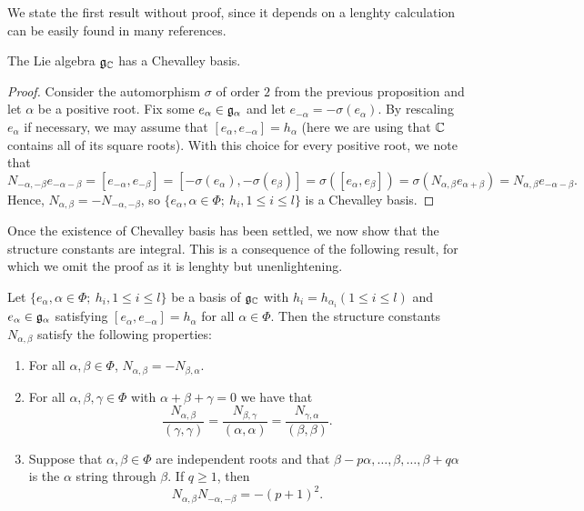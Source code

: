 We state the first result without proof, since it depends on a lenghty calculation can be easily found in many references.

\begin{cor}[Chevalley, 1955]\label{cor:chevalleybasis}
    The Lie algebra $\mathfrak{g}_{\mathbb{C}}$ has a Chevalley basis.
\end{cor}
\begin{proof}
    Consider the automorphism $\sigma$ of order $2$ from the previous proposition and let $\alpha$ be a positive root. Fix some $e_\alpha\in\mathfrak{g}_\alpha$ and let $e_{-\alpha}=-\sigma(e_\alpha)$. By rescaling $e_\alpha$ if necessary, we may assume that $[e_\alpha,e_{-\alpha}]=h_\alpha$ (here we are using that $\mathbb{C}$ contains all of its square roots). With this choice for every positive root, we note that 
    $$N_{-\alpha,-\beta}e_{-\alpha-\beta}=[e_{-\alpha},e_{-\beta}]=[-\sigma(e_\alpha),-\sigma(e_\beta)]=\sigma([e_\alpha,e_\beta])=\sigma(N_{\alpha,\beta}e_{\alpha+\beta})=N_{\alpha,\beta}e_{-\alpha-\beta}.$$
    Hence, $N_{\alpha,\beta}=-N_{-\alpha,-\beta}$, so $\{e_\alpha,\alpha\in\Phi;\ h_i, 1\leq i\leq l\}$ is a Chevalley basis.
\end{proof}

Once the existence of Chevalley basis has been settled, we now show that the structure constants are integral. This is a consequence of the following result, for which we omit the proof as it is lenghty but unenlightening. 

\begin{theorem}
    Let $\{e_\alpha,\alpha\in\Phi;\ h_i,1\leq i\leq l\}$ be a basis of $\mathfrak{g}_{\mathbb{C}}$ with $h_i=h_{\alpha_i}(1\leq i\leq l)$ and $e_\alpha\in\mathfrak{g}_\alpha$ satisfying $[e_\alpha,e_{-\alpha}]=h_\alpha$ for all $\alpha\in\Phi$. Then the structure constants $N_{\alpha,\beta}$ satisfy the following properties:
    \begin{enumerate}
        \item For all $\alpha,\beta\in\Phi$, $N_{\alpha,\beta}=-N_{\beta,\alpha}$.
        \item For all $\alpha,\beta,\gamma\in\Phi$ with $\alpha+\beta+\gamma=0$ we have that 
        $$\frac{N_{\alpha,\beta}}{(\gamma,\gamma)}=\frac{N_{\beta,\gamma}}{(\alpha,\alpha)}=\frac{N_{\gamma,\alpha}}{(\beta,\beta)}.$$
        \item Suppose that $\alpha,\beta\in\Phi$ are independent roots and that $\beta-p\alpha,\ldots,\beta,\ldots,\beta+q\alpha$ is the $\alpha$ string through $\beta$. If $q\geq1$, then 
        $$N_{\alpha,\beta}N_{-\alpha,-\beta}=-(p+1)^2.$$
    \end{enumerate}
\end{theorem}

